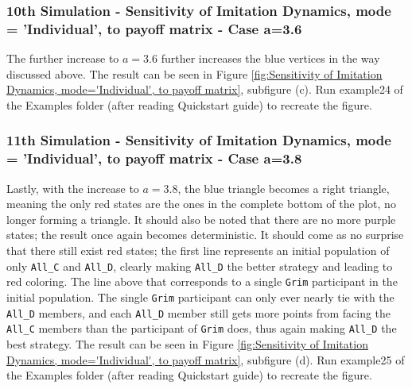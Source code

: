 \subsubsection{10th Simulation - Sensitivity of Imitation Dynamics, mode = 'Individual', to payoff matrix - Case a=3.6}
The further increase to $a=3.6$ further increases the blue vertices in the way discussed above. The result can be seen in Figure \ref{fig:Sensitivity of Imitation Dynamics, mode='Individual', to payoff matrix}, subfigure (c). Run example24 of the Examples folder (after reading Quickstart guide) to recreate the figure.

\subsubsection{11th Simulation - Sensitivity of Imitation Dynamics, mode = 'Individual', to payoff matrix - Case a=3.8}
Lastly, with the increase to $a=3.8$, the blue triangle becomes a right triangle, meaning the only red states are the ones in the complete bottom of the plot, no longer forming a triangle. It should also be noted that there are no more purple states; the result once again becomes deterministic. It should come as no surprise that there still exist red states; the first line represents an initial population of only \texttt{All\_C} and \texttt{All\_D}, clearly making \texttt{All\_D} the better strategy and leading to red coloring. The line above that corresponds to a single \texttt{Grim} participant in the initial population. The single \texttt{Grim} participant can only ever nearly tie with the \texttt{All\_D} members, and each \texttt{All\_D} member still gets more points from facing the \texttt{All\_C} members than the participant of \texttt{Grim} does, thus again making \texttt{All\_D} the best strategy. The result can be seen in Figure \ref{fig:Sensitivity of Imitation Dynamics, mode='Individual', to payoff matrix}, subfigure (d). Run example25 of the Examples folder (after reading Quickstart guide) to recreate the figure.

